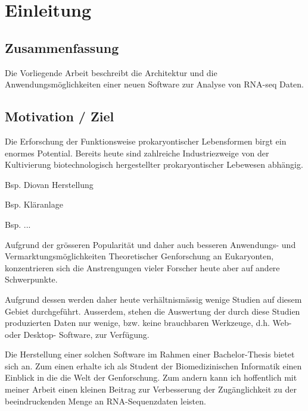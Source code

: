 \documentclass[a4paper]{thesis}
\begin{document}

\renewcommand\contentsname{Inhalt}
\tableofcontents
\listoftodos
\newpage

\section{Einleitung}

\subsection{Zusammenfassung}

Die Vorliegende Arbeit beschreibt die Architektur und die
Anwendungs\-möglichkeiten einer neuen Software zur Analyse von RNA-seq Daten.

\subsection{Motivation / Ziel}

Die Erforschung der Funktionsweise prokaryontischer Lebensformen birgt ein
enormes Potential. Bereits heute sind zahlreiche Industriezweige von der
Kultivierung biotechnologisch hergestellter prokaryontischer Lebewesen
abhängig.

\begin{list}{-}{}
 \item Bsp. Diovan Herstellung
 \item Bsp. Kläranlage
 \item Bsp. ... 
\end{list}

Aufgrund der grösseren Popularität und daher auch besseren
Anwendungs- und Vermarktungsmöglichkeiten Theoretischer Genforschung an
Eukaryonten, konzentrieren sich die Anstrengungen vieler Forscher heute
aber auf andere Schwerpunkte.

Aufgrund dessen werden daher heute verhältnismässig wenige Studien auf diesem
Gebiet durchgeführt. Ausserdem, stehen die Auswertung der durch diese Studien
produzierten Daten nur wenige, bzw. keine brauchbaren Werkzeuge, d.h.
Web- oder Desktop- Software, zur Verfügung.

Die Herstellung einer solchen Software im Rahmen einer Bachelor-Thesis
bietet sich an. Zum einen erhalte ich als Student der Biomedizinischen
Informatik einen Einblick in die die Welt der Genforschung. Zum andern kann ich
hoffentlich mit meiner Arbeit einen kleinen Beitrag zur Verbesserung der
Zugänglichkeit zu der beeindruckenden Menge an RNA-Sequenzdaten leisten.
\end{document}
